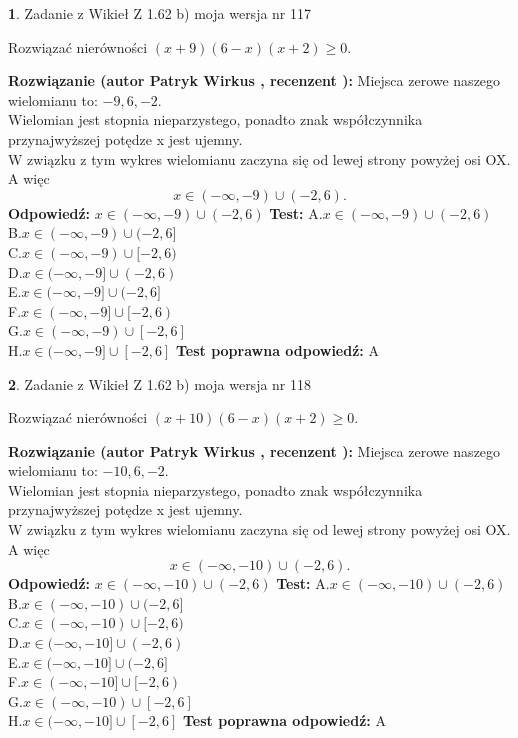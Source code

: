\documentclass[12pt, a4paper]{article}
\theoremstyle{definition} %
\newtheorem{zad}{}
\newcommand{\zadStart}[1]{\begin{zad}#1\newline}
\newcommand{\zadStop}{\end{zad}}
\newcommand{\rozwStart}[2]{\noindent \textbf{Rozwiązanie (autor #1 , recenzent #2): }\newline}
\newcommand{\rozwStop}{\newline}
\newcommand{\odpStart}{\noindent \textbf{Odpowiedź:}\newline}
\newcommand{\odpStop}{\newline}
\newcommand{\testStart}{\noindent \textbf{Test:}\newline}
\newcommand{\testStop}{\newline}
\newcommand{\kluczStart}{\noindent \textbf{Test poprawna odpowiedź:}\newline}
\newcommand{\kluczStop}{\newline}
\begin{document}
\zadStart{Zadanie z Wikieł Z 1.62 b) moja wersja nr 117}

Rozwiązać nierówności $(x+9)(6-x)(x+2)\ge0$.
\zadStop
\rozwStart{Patryk Wirkus}{}
Miejsca zerowe naszego wielomianu to: $-9, 6, -2$.\\
Wielomian jest stopnia nieparzystego, ponadto znak współczynnika przy\linebreak najwyższej potędze x jest ujemny.\\ W związku z tym wykres wielomianu zaczyna się od lewej strony powyżej osi OX. A więc $$x \in (-\infty,-9) \cup (-2,6).$$
\rozwStop
\odpStart
$x \in (-\infty,-9) \cup (-2,6)$
\odpStop
\testStart
A.$x \in (-\infty,-9) \cup (-2,6)$\\
B.$x \in (-\infty,-9) \cup (-2,6]$\\
C.$x \in (-\infty,-9) \cup [-2,6)$\\
D.$x \in (-\infty,-9] \cup (-2,6)$\\
E.$x \in (-\infty,-9] \cup (-2,6]$\\
F.$x \in (-\infty,-9] \cup [-2,6)$\\
G.$x \in (-\infty,-9) \cup [-2,6]$\\
H.$x \in (-\infty,-9] \cup [-2,6]$
\testStop
\kluczStart
A
\kluczStop



\zadStart{Zadanie z Wikieł Z 1.62 b) moja wersja nr 118}

Rozwiązać nierówności $(x+10)(6-x)(x+2)\ge0$.
\zadStop
\rozwStart{Patryk Wirkus}{}
Miejsca zerowe naszego wielomianu to: $-10, 6, -2$.\\
Wielomian jest stopnia nieparzystego, ponadto znak współczynnika przy\linebreak najwyższej potędze x jest ujemny.\\ W związku z tym wykres wielomianu zaczyna się od lewej strony powyżej osi OX. A więc $$x \in (-\infty,-10) \cup (-2,6).$$
\rozwStop
\odpStart
$x \in (-\infty,-10) \cup (-2,6)$
\odpStop
\testStart
A.$x \in (-\infty,-10) \cup (-2,6)$\\
B.$x \in (-\infty,-10) \cup (-2,6]$\\
C.$x \in (-\infty,-10) \cup [-2,6)$\\
D.$x \in (-\infty,-10] \cup (-2,6)$\\
E.$x \in (-\infty,-10] \cup (-2,6]$\\
F.$x \in (-\infty,-10] \cup [-2,6)$\\
G.$x \in (-\infty,-10) \cup [-2,6]$\\
H.$x \in (-\infty,-10] \cup [-2,6]$
\testStop
\kluczStart
A
\kluczStop
\end{document}
